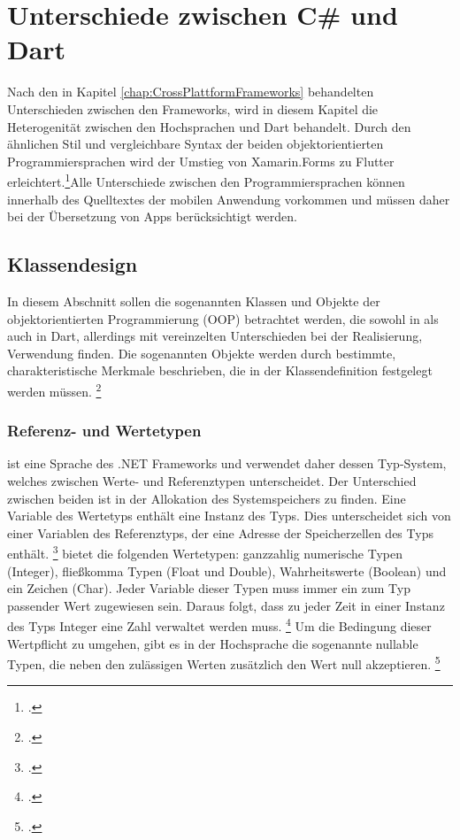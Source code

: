 \chapter{Unterschiede zwischen C\# und Dart}
\label{chap:Programmiersprachen}

Nach den in Kapitel \ref{chap:CrossPlattformFrameworks} behandelten Unterschieden zwischen den Frameworks, wird in diesem Kapitel die Heterogenität zwischen den Hochsprachen \Csharp{} und Dart behandelt.  Durch den ähnlichen Stil und vergleichbare Syntax der beiden objektorientierten Programmiersprachen wird der Umstieg von Xamarin.Forms zu Flutter erleichtert.\footcite[Vgl. ][Abgerufen am \today]{Pedley2019}Alle Unterschiede zwischen den Programmiersprachen können innerhalb des Quelltextes der mobilen Anwendung vorkommen und müssen daher bei der Übersetzung von Apps berücksichtigt werden.

\section{Klassendesign}
In diesem Abschnitt sollen die sogenannten Klassen und Objekte der objektorientierten Programmierung (OOP) betrachtet werden, die sowohl in \Csharp{} als auch in Dart, allerdings mit vereinzelten Unterschieden bei der Realisierung, Verwendung finden. Die sogenannten Objekte werden durch bestimmte,  charakteristische Merkmale beschrieben,  die in der Klassendefinition festgelegt werden müssen. \footcite[Vgl.][S. 11f.]{Witte2013}

\subsection{Referenz- und Wertetypen}
\Csharp{} ist eine Sprache des \glq .NET Frameworks\grq{} und verwendet daher dessen Typ-System,  welches zwischen Werte- und Referenztypen unterscheidet.  Der Unterschied zwischen beiden ist in der Allokation des Systemspeichers zu finden.  Eine Variable des Wertetyps enthält eine Instanz des Typs.  Dies unterscheidet sich von einer Variablen des Referenztyps, der eine Adresse der Speicherzellen des Typs enthält. \footcite[Vgl.][S. 155f.]{Kühnel2019} \Csharp{} bietet die folgenden Wertetypen: ganzzahlig numerische Typen (Integer),  fließkomma  Typen (Float und Double),  Wahrheitswerte (Boolean) und ein Zeichen (Char).  Jeder Variable dieser Typen muss immer ein zum Typ passender Wert zugewiesen sein.  Daraus folgt,  dass zu jeder Zeit in einer Instanz des Typs Integer eine Zahl verwaltet werden muss. \footcite[Vgl. ][Abgerufen am \today]{MicrosoftValueTypes2020} Um die Bedingung dieser Wertpflicht zu umgehen,  gibt es in der Hochsprache \Csharp{} die sogenannte \glq nullable\grq{} Typen,  die neben den zulässigen Werten zusätzlich den Wert \glq null\grq{} akzeptieren. \footcite[Vgl.][S. 167]{Bayer2008} 

